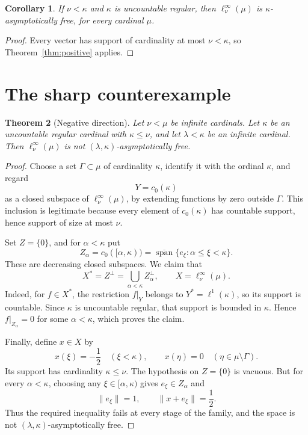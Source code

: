 \documentclass[11pt]{article}
\newtheorem{theorem}{Theorem}
\newtheorem{corollary}[theorem]{Corollary}
\theoremstyle{remark}
\newcommand{\lin}{\operatorname{span}}
\begin{document}
\begin{corollary}
\label{cor:upper}
If \(\nu<\kappa\) and \(\kappa\) is uncountable regular, then
\(\ell_\nu^\infty(\mu)\) is \(\kappa\)-asymptotically free, for every
cardinal \(\mu\).
\end{corollary}

\begin{proof}
Every vector has support of cardinality at most \(\nu<\kappa\), so
Theorem~\ref{thm:positive} applies.
\end{proof}

\section{The sharp counterexample}

\begin{theorem}[Negative direction]
\label{thm:negative}
Let \(\nu<\mu\) be infinite cardinals.  Let \(\kappa\) be an uncountable
regular cardinal with \(\kappa\leq\nu\), and let \(\lambda<\kappa\) be an
infinite cardinal.  Then \(\ell_\nu^\infty(\mu)\) is not
\((\lambda,\kappa)\)-asymptotically free.
\end{theorem}

\begin{proof}
Choose a set \(\Gamma\subset\mu\) of cardinality \(\kappa\), identify it
with the ordinal \(\kappa\), and regard
\[
 Y=c_0(\kappa)
\]
as a closed subspace of \(\ell_\nu^\infty(\mu)\), by extending functions
by zero outside \(\Gamma\).  This inclusion is legitimate because every
element of \(c_0(\kappa)\) has countable support, hence support of size at
most \(\nu\).

Set \(Z=\{0\}\), and for \(\alpha<\kappa\) put
\[
 Z_\alpha=c_0([\alpha,\kappa))
 =\overline{\lin}\{e_\xi:\alpha\leq\xi<\kappa\}.
\]
These are decreasing closed subspaces.  We claim that
\[
 X^*=Z^\perp=\bigcup_{\alpha<\kappa}Z_\alpha^\perp,
 \qquad X=\ell_\nu^\infty(\mu).
\]
Indeed, for \(f\in X^*\), the restriction \(f|_Y\) belongs to
\(Y^*=\ell^1(\kappa)\), so its support is countable.  Since \(\kappa\) is
uncountable regular, that support is bounded in \(\kappa\).  Hence
\(f|_{Z_\alpha}=0\) for some \(\alpha<\kappa\), which proves the claim.

Finally, define \(x\in X\) by
\[
 x(\xi)=-\frac12\quad(\xi<\kappa),
 \qquad x(\eta)=0\quad(\eta\in\mu\setminus\Gamma).
\]
Its support has cardinality \(\kappa\leq\nu\).  The hypothesis on
\(Z=\{0\}\) is vacuous.  But for every \(\alpha<\kappa\), choosing any
\(\xi\in[\alpha,\kappa)\) gives \(e_\xi\in Z_\alpha\) and
\[
 \|e_\xi\|=1,
 \qquad
 \|x+e_\xi\|=\frac12.
\]
Thus the required inequality fails at every stage of the family, and the
space is not \((\lambda,\kappa)\)-asymptotically free.
\end{proof}
\end{document}
